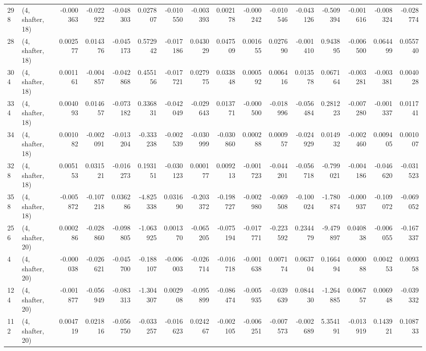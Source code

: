 \begin{tabular}{llrrrrrrrrrrrrrr}
298 &  (4, shafter, 18) &  -0.000363 & -0.022922 & -0.048303 &    0.027807 & -0.010550 &  -0.003393 &  0.002178 & -0.000242 & -0.010546 & -0.043126 &   -0.509394 & -0.001616 & -0.008324 & -0.028774 \\
28  &  (4, shafter, 18) &   0.002577 &  0.014376 & -0.045173 &    0.572942 & -0.017186 &   0.043029 &  0.047509 &  0.001655 &  0.027690 & -0.001410 &    0.943895 & -0.006500 &  0.064499 &  0.055740 \\
304 &  (4, shafter, 18) &   0.001161 & -0.004857 & -0.042868 &    0.455156 & -0.017721 &   0.027975 &  0.033848 &  0.000592 &  0.006416 &  0.013578 &    0.067164 & -0.003281 & -0.003381 &  0.004028 \\
334 &  (4, shafter, 18) &   0.004093 &  0.014657 & -0.073182 &    0.336831 & -0.042049 &  -0.029643 &  0.013771 & -0.000500 & -0.018996 & -0.056484 &    0.281223 & -0.007280 & -0.001337 &  0.011741 \\
34  &  (4, shafter, 18) &   0.001082 & -0.002091 & -0.013204 &   -0.333238 & -0.002539 &  -0.030999 & -0.030860 &  0.000288 &  0.000957 & -0.024929 &    0.014932 & -0.002460 &  0.009405 &  0.001007 \\
328 &  (4, shafter, 18) &   0.005153 &  0.031521 & -0.016273 &    0.193151 & -0.030123 &   0.000177 &  0.009213 & -0.001723 & -0.044201 & -0.056718 &   -0.799021 & -0.004186 & -0.046620 & -0.031523 \\
358 &  (4, shafter, 18) &  -0.005872 & -0.107218 &  0.036286 &   -4.825338 &  0.031690 &  -0.203372 & -0.198727 & -0.002980 & -0.069508 & -0.100024 &   -1.780874 & -0.000937 & -0.109072 & -0.069052 \\
256 &  (4, shafter, 20) &   0.000286 & -0.028860 & -0.098805 &   -1.063925 &  0.001370 &  -0.065205 & -0.075194 & -0.017771 & -0.223592 &  0.234479 &   -9.479897 &  0.040838 & -0.006055 & -0.167337 \\
4   &  (4, shafter, 20) &  -0.000038 & -0.026621 & -0.045700 &   -0.188107 & -0.006003 &  -0.026714 & -0.016718 & -0.001638 &  0.007174 &  0.063704 &    0.166494 &  0.000088 &  0.004253 &  0.009358 \\
124 &  (4, shafter, 20) &  -0.001877 & -0.056949 & -0.083313 &   -1.304307 &  0.002908 &  -0.095899 & -0.086474 & -0.005935 & -0.039639 &  0.084430 &   -1.264885 &  0.006757 &  0.006948 & -0.039332 \\
112 &  (4, shafter, 20) &   0.004719 &  0.021816 & -0.056750 &   -0.033257 & -0.016623 &   0.024267 & -0.002105 & -0.006251 & -0.007573 & -0.002689 &    5.354191 & -0.013919 &  0.143921 &  0.108733 \\

\end{tabular}
